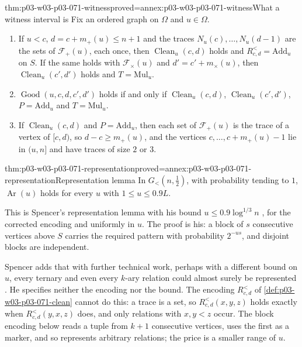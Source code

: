 \begin{hblemma}{thm:p03-w03-p03-071-witness}{proved=annex:p03-w03-p03-071-witness}{What a witness interval is}
Fix an ordered graph on \(\Omega\) and \(u\in\Omega\).
\begin{enumerate}
\item If \(u<c\), \(d=c+m_+(u)\leq n+1\) and the traces
  \(N_u(c),\ldots,N_u(d-1)\) are the sets of \(\mathcal F_+(u)\), each once,
  then \(\operatorname{Clean}_u(c,d)\) holds and \(R^<_{c,d}=\mathrm{Add}_u\)
  on \(S\).  If the same holds with \(\mathcal F_\times(u)\) and
  \(d'=c'+m_\times(u)\), then \(\operatorname{Clean}_u(c',d')\) holds and
  \(T=\mathrm{Mul}_u\).
\item \(\operatorname{Good}(u,c,d,c',d')\) holds if and only if
  \(\operatorname{Clean}_u(c,d)\), \(\operatorname{Clean}_u(c',d')\),
  \(P=\mathrm{Add}_u\) and \(T=\mathrm{Mul}_u\).
\item If \(\operatorname{Clean}_u(c,d)\) and \(P=\mathrm{Add}_u\), then each
  set of \(\mathcal F_+(u)\) is the trace of a vertex of \([c,d)\), so
  \(d-c\geq m_+(u)\), and the vertices \(c,\ldots,c+m_+(u)-1\) lie in
  \((u,n]\) and have traces of size \(2\) or \(3\).
\end{enumerate}
\end{hblemma}

\begin{hbtheorem}{thm:p03-w03-p03-071-representation}{proved=annex:p03-w03-p03-071-representation}{Representation lemma}
In \(G_<(n,\frac12)\), with probability tending to \(1\),
\(\operatorname{Ar}(u)\) holds for every \(u\) with \(1\leq u\leq0.9L\).
\end{hbtheorem}

This is Spencer's representation lemma with his bound
\(u\leq0.9\log^{1/3}n\) \cite[p.~23]{Spencer2007LogicRandomStructuresAuthor},
for the corrected encoding and uniformly in \(u\).  The proof is his: a block
of \(s\) consecutive vertices above \(S\) carries the required pattern with
probability \(2^{-us}\), and disjoint blocks are independent.

Spencer adds that with further technical work, perhaps with a different
bound on \(u\), every ternary and even every \(k\)-ary relation could almost
surely be represented \cite[p.~23]{Spencer2007LogicRandomStructuresAuthor}.
He specifies neither the encoding nor the bound.  The encoding
\(R^<_{c,d}\) of \cref{def:p03-w03-p03-071-clean} cannot do this: a trace is
a set, so \(R^<_{c,d}(x,y,z)\) holds exactly when \(R^<_{c,d}(y,x,z)\) does,
and only relations with \(x,y<z\) occur.  The block encoding below reads a tuple from \(k+1\)
consecutive vertices, uses the first as a marker, and so represents
arbitrary relations; the price is a smaller range of \(u\).

